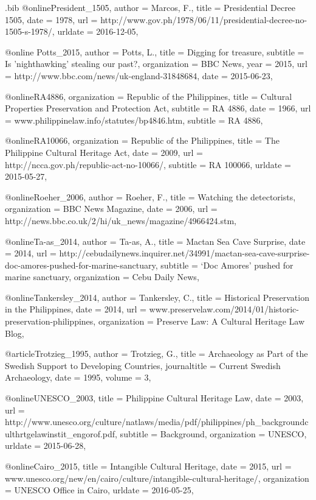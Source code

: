 \begin{filecontents}{\IJSRAidentifier.bib}
@online{President_1505,
	author = {Marcos, F.},
	title = {Presidential Decree 1505},
	date = {1978},
	url = {http://www.gov.ph/1978/06/11/presidential-decree-no-1505-s-1978/},
	urldate = {2016-12-05},
}

@online {Potts_2015,
	author = {Potts, L.},
	title  = {Digging for treasure},
	subtitle = {Is 'nighthawking' stealing our past?},
	organization = {BBC News},
	year   = {2015},
	url    = {http://www.bbc.com/news/uk-england-31848684},
	date = {2015-06-23},
}


@online{RA4886,
	organization = {Republic of the Philippines},
	title = {Cultural Properties Preservation and Protection Act},
	subtitle = {RA 4886},
	date = {1966},
	url = {www.philippinelaw.info/statutes/bp4846.htm},
	subtitle = {RA 4886},
}

@online{RA10066,
	organization = {Republic of the Philippines},
	title = {The Philippine Cultural Heritage Act},
	date = {2009},
	url = {http://ncca.gov.ph/republic-act-no-10066/},
	subtitle = {RA 100066},
	urldate = {2015-05-27},
}

@online{Roeher_2006,
	author = {Roeher, F.},
	title  = {Watching the detectorists},
	organization = {BBC News Magazine},
	date   = {2006},
	url    = {http://news.bbc.co.uk/2/hi/uk_news/magazine/4966424.stm},
}

@online{Ta-as_2014,
	author = {Ta-as, A.},
	title = {Mactan Sea Cave Surprise},
	date = {2014},
	url = {http://cebudailynews.inquirer.net/34991/mactan-sea-cave-surprise-doc-amores-pushed-for-marine-sanctuary},
	subtitle = {‘Doc Amores’ pushed for marine sanctuary},
	organization = {Cebu Daily News},
}

@online{Tankersley_2014,
	author = {Tankersley, C.},
	title = {Historical Preservation in the Philippines},
	date = {2014},
	url = {www.preservelaw.com/2014/01/historic-preservation-philippines},
	organization = {Preserve Law: A Cultural Heritage Law Blog},
}

@article{Trotzieg_1995,
	author = {Trotzieg, G.},
	title = {Archaeology as Part of the Swedish Support to Developing Countries},
	journaltitle = {Current Swedish Archaeology},
	date = {1995},
	volume = {3},
}

@online{UNESCO_2003,
	title = {Philippine Cultural Heritage Law},
	date = {2003},
	url = {http://www.unesco.org/culture/natlaws/media/pdf/philippines/ph_backgroundculthrtgelawinstit_engorof.pdf},
	subtitle = {Background},
	organization = {UNESCO},
	urldate = {2015-06-28},
}

@online{Cairo_2015,
	title = {Intangible Cultural Heritage},
	date = {2015},
	url = {www.unesco.org/new/en/cairo/culture/intangible-cultural-heritage/},
	organization = {UNESCO Office in Cairo},
	urldate = {2016-05-25},
}


\end{filecontents}

